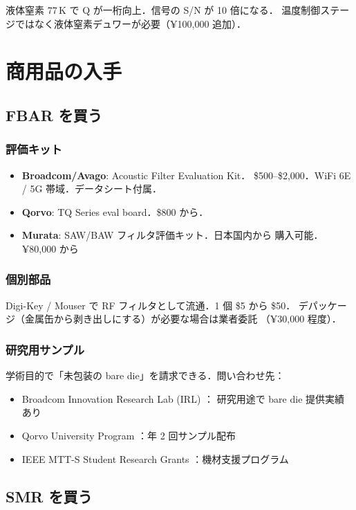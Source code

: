 \documentclass[11pt,a4paper]{article}
\begin{document}
液体窒素 77\,K で Q が一桁向上．信号の S/N が 10 倍になる．
温度制御ステージではなく液体窒素デュワーが必要（¥100,000 追加）．

\section{商用品の入手}

\subsection{FBAR を買う}

\subsubsection{評価キット}

\begin{itemize}
\item \textbf{Broadcom/Avago}: Acoustic Filter Evaluation Kit．
\$500--\$2,000．WiFi 6E / 5G 帯域．データシート付属．
\item \textbf{Qorvo}: TQ Series eval board．\$800 から．
\item \textbf{Murata}: SAW/BAW フィルタ評価キット．日本国内から
購入可能．¥80,000 から
\end{itemize}

\subsubsection{個別部品}

Digi-Key / Mouser で RF フィルタとして流通．1 個 \$5 から \$50．
デパッケージ（金属缶から剥き出しにする）が必要な場合は業者委託
（¥30,000 程度）．

\subsubsection{研究用サンプル}

学術目的で「未包装の bare die」を請求できる．問い合わせ先：
\begin{itemize}
\item Broadcom Innovation Research Lab (IRL) ：
研究用途で bare die 提供実績あり
\item Qorvo University Program ：年 2 回サンプル配布
\item IEEE MTT-S Student Research Grants ：機材支援プログラム
\end{itemize}

\subsection{SMR を買う}
\end{document}
